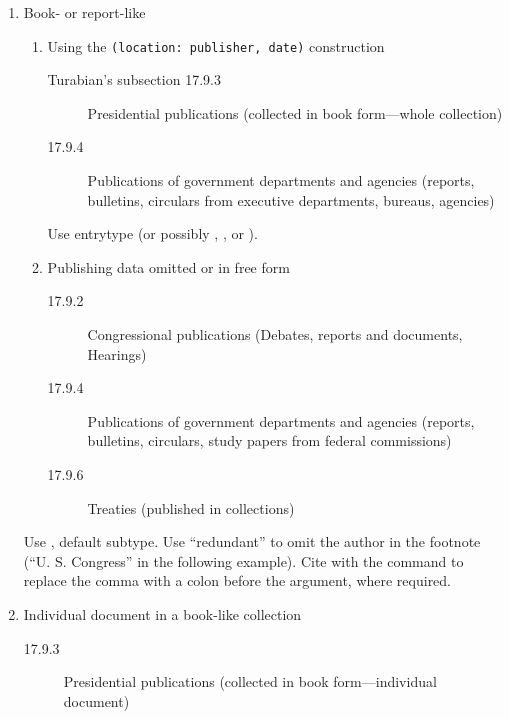 \documentclass{ltxdockit}[2010/02/12]
\begin{document}
{\begin{enumerate}
\begin{enumerate}
		\item Book- or report-like
		
		\begin{enumerate}
		
			\item Using the  \verb|(location: publisher, date)| construction
			
			\begin{description}
				\item [Turabian's subsection 17.9.3] Presidential publications (collected in book form---whole collection) 
				\item [17.9.4] Publications of government departments and agencies (reports, bulletins, circulars from executive departments, bureaus, agencies)
			\end{description}
			
			Use entrytype  (or possibly , , or ).\autocites[][]{US1984an-oilspill-risk}
			
			\item Publishing data omitted or in free form

			\begin{description}
				\item [17.9.2] Congressional publications (Debates, reports and documents, Hearings) 
				\item [17.9.4] Publications of government departments and agencies (reports, bulletins, circulars, study papers from federal commissions)
				\item [17.9.6] Treaties (published in collections)
			\end{description}
		\end{enumerate}
		
		Use , default subtype.
		Use  ``redundant'' to omit the author in the footnote (``U. S. Congress'' in the following example).\autocites[][]{hj15eh}
		Cite with the  command to replace the comma with a colon before the  argument, where required.
		
		\item Individual document in a book-like collection

			\begin{description}
				\item [17.9.3] Presidential publications (collected in book form---individual document) 
			\end{description}
			

\end{enumerate}
\end{enumerate}}
\end{document}
